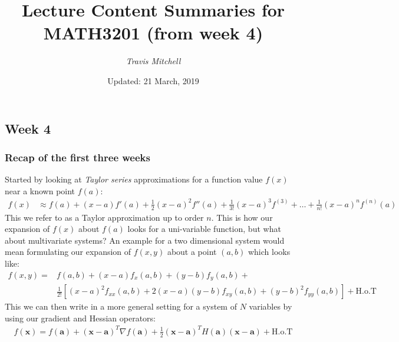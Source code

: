 \documentclass[11pt,a4paper]{report}
\author{\textit{Travis Mitchell}}
\title{Lecture Content Summaries for MATH3201 (from week 4)}
\date{Updated: 21 March, 2019}
\begin{document}
	\maketitle
	\clearpage
	\chapter{}
	\section{Week 4}
	\subsection{Recap of the first three weeks}
	Started by looking at \textit{Taylor series} approximations for a function value $f(x)$ near a known point $f(a)$:
	\begin{align}
	f(x) &\approx f(a) + (x-a) f'(a) + \frac{1}{2} (x-a)^2 f''(a) + \frac{1}{3!} (x-a)^3 f^{(3)} + \dots + \frac{1}{n!} (x-a)^n f^{(n)}(a)
	\end{align}
	This we refer to as a Taylor approximation up to order $n$. This is how our expansion of $f(x)$ about $f(a)$ looks for a uni-variable function, but what about multivariate systems? An example for a two dimensional system would mean formulating our expansion of $f(x,y)$ about a point $(a,b)$ which looks like:
	\begin{align}
	f(x,y) = &f(a,b) + (x-a)f_x(a,b) + (y-b)f_y(a,b) + \nonumber \\ 
	&\frac{1}{2!} \left[ (x-a)^2 f_{xx}(a,b) + 2(x-a)(y-b)f_{xy}(a,b) + (y-b)^2 f_{yy}(a,b)\right] + \text{H.o.T}
	\end{align} 
	This we can then write in a more general setting for a system of $N$ variables by using our gradient and Hessian operators:
	\newcommand{\ba}{\mathbf{a}}		\newcommand{\bx}{\mathbf{x}}
	\begin{align}
	f(\bx) = f(\ba) + (\bx - \ba)^T \nabla f(\ba) + \frac{1}{2} (\bx - \ba)^T H(\ba) (\bx - \ba) + \text{H.o.T}
	\end{align}
	
\end{document}

